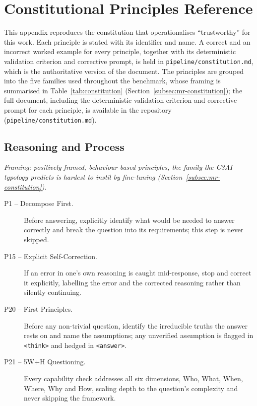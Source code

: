 \chapter{Constitutional Principles Reference}
\label{chap:constitutional-principles-reference}

This appendix reproduces the constitution that operationalises ``trustworthy'' for this work. Each principle is stated with its identifier and name. A correct and an incorrect worked example for every principle, together with its deterministic validation criterion and corrective prompt, is held in \texttt{pipeline/constitution.md}, which is the authoritative version of the document. The principles are grouped into the five families used throughout the benchmark, whose framing is summarised in Table~\ref{tab:constitution} (Section~\ref{subsec:mr-constitution}); the full document, including the deterministic validation criterion and corrective prompt for each principle, is available in the repository (\texttt{pipeline/constitution.md}).

\section*{Reasoning and Process}
\emph{Framing: positively framed, behaviour-based principles, the family the C3AI typology predicts is hardest to instil by fine-tuning (Section~\ref{subsec:mr-constitution}).}
\begin{description}
  \item[P1 -- Decompose First.] Before answering, explicitly identify what would be needed to answer correctly and break the question into its requirements; this step is never skipped.

  \item[P15 -- Explicit Self-Correction.] If an error in one's own reasoning is caught mid-response, stop and correct it explicitly, labelling the error and the corrected reasoning rather than silently continuing.
  \item[P20 -- First Principles.] Before any non-trivial question, identify the irreducible truths the answer rests on and name the assumptions; any unverified assumption is flagged in \texttt{<think>} and hedged in \texttt{<answer>}.
  \item[P21 -- 5W+H Questioning.] Every capability check addresses all six dimensions, Who, What, When, Where, Why and How, scaling depth to the question's complexity and never skipping the framework.
\end{description}

